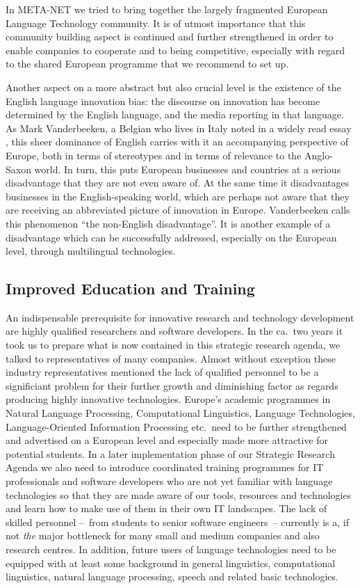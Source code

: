 \documentclass[10pt, plain]{../../metanetpaper}
\begin{document}
\begin{multicols}{2}
In META-NET we tried to bring together the largely fragmented European Language Technology community. It is of utmost importance that this community building aspect is continued and further strengthened in order to enable companies to cooperate and to being competitive, especially with regard to the shared European programme that we recommend to set up.

Another aspect on a more abstract but also crucial level is the existence of the English language innovation bias: the discourse on innovation has become determined by the English language, and the media reporting in that language. As Mark Vanderbeeken, a Belgian who lives in Italy noted in a widely read essay \cite{vanderbeeken2012}, this sheer dominance of English carries with it an accompanying perspective of Europe, both in terms of stereotypes and in terms of relevance to the Anglo-Saxon world. In turn, this puts European businesses and countries at a serious disadvantage that they are not even aware of. At the same time it disadvantages businesses in the English-speaking world, which are perhaps not aware that they are receiving an abbreviated picture of innovation in Europe. Vanderbeeken calls this phenomenon ``the non-English disadvantage''. It is another example of a disadvantage which can be successfully addressed, especially on the European level, through multilingual technologies.

\subsection{Improved Education and Training}
\label{sec:improved-edu-and-training}

An indispensable prerequisite for innovative research and technology development are highly qualified researchers and software developers. In the ca.~two years it took us to prepare what is now contained in this strategic research agenda, we talked to representatives of many companies. Almost without exception these industry representatives mentioned the lack of qualified personnel to be a significiant problem for their further growth and diminishing factor as regards producing highly innovative technologies. Europe's academic programmes in Natural Language Processing, Computational Linguistics, Language Technologies, Language-Oriented Information Processing etc.~need to be further strengthened and advertised on a European level and especially made more attractive for potential students. In a later implementation phase of our Strategic Research Agenda we also need to introduce coordinated training programmes for IT professionals and software developers who are not yet familiar with language technologies so that they are made aware of our tools, resources and technologies and learn how to make use of them in their own IT landscapes. The lack of skilled personnel --~from students to senior software engineers~-- currently is a, if not \emph{the} major bottleneck for many small and medium companies and also research centres. In addition, future users of language technologies need to be equipped with at least some background in general linguistics, computational linguistics, natural language processing, speech and related basic technologies.


\end{multicols}
\end{document}
